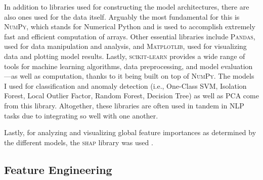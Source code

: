 \documentclass[12pt,a4paper]{article}
\numberwithin{figure}{section}
\numberwithin{table}{section}
\numberwithin{definition}{section}
\begin{document}
In addition to libraries used for constructing the model architectures, there are also ones used for the data itself. Arguably the most fundamental for this is \textsc{NumPy}\parencite{Harris2020article}, which stands for Numerical Python and is used to accomplish extremely fast and efficient computation of arrays. Other essential libraries include \textsc{Pandas}\parencite{reback2020pandas,Mckinney2010article}, used for data manipulation and analysis, and \textsc{Matplotlib}\parencite{Hunter2007article}, used for visualizing data and plotting model results. Lastly, \textsc{scikit-learn}\parencite{Pedregosa2011article} provides a wide range of tools for machine learning algorithms, data preprocessing, and model evaluation---as well as computation, thanks to it being built on top of \textsc{NumPy}. The models I used for classification and anomaly detection (i.e., One-Class SVM, Isolation Forest, Local Outlier Factor, Random Forest, Decision Tree) as well as PCA come from this library. Altogether, these libraries are often used in tandem in NLP tasks due to integrating so well with one another.

Lastly, for analyzing and visualizing global feature importances as determined by the different models, the \textsc{shap} library was used \parencite{Lundberg2017article}.

\subsection{Feature Engineering}
\label{ssec:featureengineering}


\end{document}

